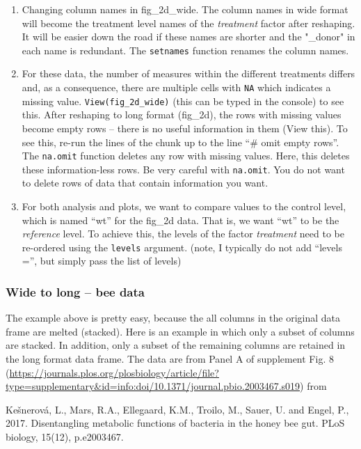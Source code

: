 \documentclass[]{book}
\begin{document}
\begin{enumerate}
\def\labelenumi{\arabic{enumi}.}
\item
  Changing column names in fig\_2d\_wide. The column names in wide format will become the treatment level names of the \emph{treatment} factor after reshaping. It will be easier down the road if these names are shorter and the "\_donor" in each name is redundant. The \texttt{setnames} function renames the column names.
\item
  For these data, the number of measures within the different treatments differs and, as a consequence, there are multiple cells with \texttt{NA} which indicates a missing value. \texttt{View(fig\_2d\_wide)} (this can be typed in the console) to see this. After reshaping to long format (fig\_2d), the rows with missing values become empty rows -- there is no useful information in them (View this). To see this, re-run the lines of the chunk up to the line ``\# omit empty rows''. The \texttt{na.omit} function deletes any row with missing values. Here, this deletes these information-less rows. Be very careful with \texttt{na.omit}. You do not want to delete rows of data that contain information you want.
\item
  For both analysis and plots, we want to compare values to the control level, which is named ``wt'' for the fig\_2d data. That is, we want ``wt'' to be the \emph{reference} level. To achieve this, the levels of the factor \emph{treatment} need to be re-ordered using the \texttt{levels} argument. (note, I typically do not add ``levels ='', but simply pass the list of levels)
\end{enumerate}

\hypertarget{wide-to-long-bee-data}{%
\subsubsection{Wide to long -- bee data}\label{wide-to-long-bee-data}}

The example above is pretty easy, because the all columns in the original data frame are melted (stacked). Here is an example in which only a subset of columns are stacked. In addition, only a subset of the remaining columns are retained in the long format data frame. The data are from Panel A of supplement Fig. 8 (\url{https://journals.plos.org/plosbiology/article/file?type=supplementary\&id=info:doi/10.1371/journal.pbio.2003467.s019}) from

Kešnerová, L., Mars, R.A., Ellegaard, K.M., Troilo, M., Sauer, U. and Engel, P., 2017. Disentangling metabolic functions of bacteria in the honey bee gut. PLoS biology, 15(12), p.e2003467.
\end{document}
